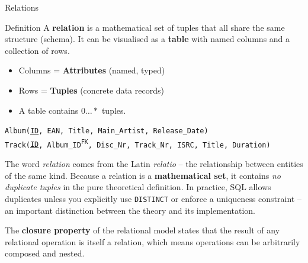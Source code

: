 \begin{frame}{Relations}
  \begin{block}{Definition}
    A \textbf{relation} is a mathematical set of tuples that all share the same
    structure (schema).  It can be visualised as a \textbf{table} with named
    columns and a collection of rows.
    \begin{itemize}
      \item Columns = \textbf{Attributes} (named, typed)
      \item Rows = \textbf{Tuples} (concrete data records)
      \item A table contains $0 \ldots *$ tuples.
    \end{itemize}
  \end{block}

  \begin{examples}{}
    \texttt{Album(\underline{ID}, EAN, Title, Main\_Artist, Release\_Date)}\\
    \texttt{Track(\underline{ID}, Album\_ID\textsuperscript{FK}, Disc\_Nr, Track\_Nr, ISRC, Title, Duration)}
  \end{examples}

  The word \emph{relation} comes from the Latin \emph{relatio} -- the
  relationship between entities of the same kind.  Because a relation is a
  \textbf{mathematical set}, it contains \emph{no duplicate tuples} in the
  pure theoretical definition.  In practice, SQL allows duplicates unless you
  explicitly use \texttt{DISTINCT} or enforce a uniqueness constraint -- an
  important distinction between the theory and its implementation.

  The \textbf{closure property} of the relational model states that the
  result of any relational operation is itself a relation, which means
  operations can be arbitrarily composed and nested.
\end{frame}


